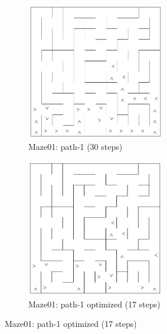 \documentclass[11pt, oneside]{article}   	%
\begin{document}
\begin{figure}
\centering
\begin{subfigure}{7cm}
  \centering
  \includegraphics[width=6cm]{maze-01-1st.png}
  \caption{Maze01: path-1 (30 steps)}
  \label{fig:path-1}
\end{subfigure}%
\begin{subfigure}{7cm}
  \centering
  \includegraphics[width=6cm]{maze-01-1st-star.png}
  \caption{Maze01: path-1 optimized (17 steps)}
  \label{fig:path-1-optimized}
\end{subfigure}


\end{figure}
\end{document}
